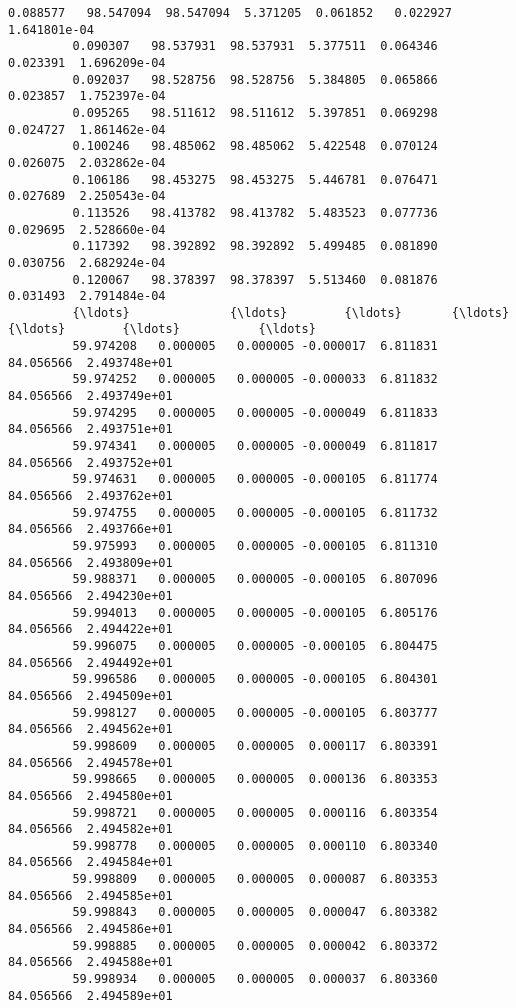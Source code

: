\documentclass[11pt]{article}
\begin{document}
\begin{Verbatim}[commandchars=\\\{\}]
         0.088577   98.547094  98.547094  5.371205  0.061852   0.022927  1.641801e-04
         0.090307   98.537931  98.537931  5.377511  0.064346   0.023391  1.696209e-04
         0.092037   98.528756  98.528756  5.384805  0.065866   0.023857  1.752397e-04
         0.095265   98.511612  98.511612  5.397851  0.069298   0.024727  1.861462e-04
         0.100246   98.485062  98.485062  5.422548  0.070124   0.026075  2.032862e-04
         0.106186   98.453275  98.453275  5.446781  0.076471   0.027689  2.250543e-04
         0.113526   98.413782  98.413782  5.483523  0.077736   0.029695  2.528660e-04
         0.117392   98.392892  98.392892  5.499485  0.081890   0.030756  2.682924e-04
         0.120067   98.378397  98.378397  5.513460  0.081876   0.031493  2.791484e-04
         {\ldots}              {\ldots}        {\ldots}       {\ldots}       {\ldots}        {\ldots}           {\ldots}
         59.974208   0.000005   0.000005 -0.000017  6.811831  84.056566  2.493748e+01
         59.974252   0.000005   0.000005 -0.000033  6.811832  84.056566  2.493749e+01
         59.974295   0.000005   0.000005 -0.000049  6.811833  84.056566  2.493751e+01
         59.974341   0.000005   0.000005 -0.000049  6.811817  84.056566  2.493752e+01
         59.974631   0.000005   0.000005 -0.000105  6.811774  84.056566  2.493762e+01
         59.974755   0.000005   0.000005 -0.000105  6.811732  84.056566  2.493766e+01
         59.975993   0.000005   0.000005 -0.000105  6.811310  84.056566  2.493809e+01
         59.988371   0.000005   0.000005 -0.000105  6.807096  84.056566  2.494230e+01
         59.994013   0.000005   0.000005 -0.000105  6.805176  84.056566  2.494422e+01
         59.996075   0.000005   0.000005 -0.000105  6.804475  84.056566  2.494492e+01
         59.996586   0.000005   0.000005 -0.000105  6.804301  84.056566  2.494509e+01
         59.998127   0.000005   0.000005 -0.000105  6.803777  84.056566  2.494562e+01
         59.998609   0.000005   0.000005  0.000117  6.803391  84.056566  2.494578e+01
         59.998665   0.000005   0.000005  0.000136  6.803353  84.056566  2.494580e+01
         59.998721   0.000005   0.000005  0.000116  6.803354  84.056566  2.494582e+01
         59.998778   0.000005   0.000005  0.000110  6.803340  84.056566  2.494584e+01
         59.998809   0.000005   0.000005  0.000087  6.803353  84.056566  2.494585e+01
         59.998843   0.000005   0.000005  0.000047  6.803382  84.056566  2.494586e+01
         59.998885   0.000005   0.000005  0.000042  6.803372  84.056566  2.494588e+01
         59.998934   0.000005   0.000005  0.000037  6.803360  84.056566  2.494589e+01

\end{Verbatim}
\end{document}
